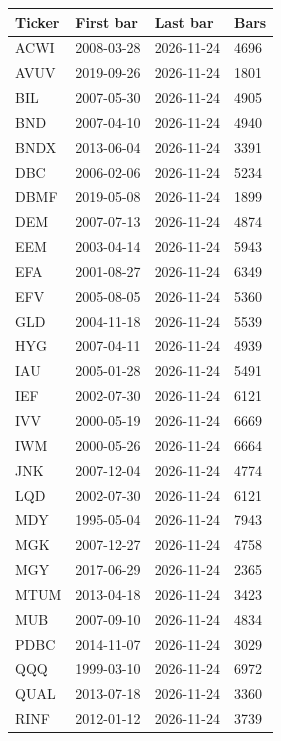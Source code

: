 \begin{tabularx}{\textwidth}{@{}P{0.62in}P{0.92in}P{0.92in}Y@{}}
\toprule
Ticker & First bar & Last bar & Bars \\
\midrule
ACWI & 2008-03-28 & 2026-11-24 & 4696 \\
AVUV & 2019-09-26 & 2026-11-24 & 1801 \\
BIL & 2007-05-30 & 2026-11-24 & 4905 \\
BND & 2007-04-10 & 2026-11-24 & 4940 \\
BNDX & 2013-06-04 & 2026-11-24 & 3391 \\
DBC & 2006-02-06 & 2026-11-24 & 5234 \\
DBMF & 2019-05-08 & 2026-11-24 & 1899 \\
DEM & 2007-07-13 & 2026-11-24 & 4874 \\
EEM & 2003-04-14 & 2026-11-24 & 5943 \\
EFA & 2001-08-27 & 2026-11-24 & 6349 \\
EFV & 2005-08-05 & 2026-11-24 & 5360 \\
GLD & 2004-11-18 & 2026-11-24 & 5539 \\
HYG & 2007-04-11 & 2026-11-24 & 4939 \\
IAU & 2005-01-28 & 2026-11-24 & 5491 \\
IEF & 2002-07-30 & 2026-11-24 & 6121 \\
IVV & 2000-05-19 & 2026-11-24 & 6669 \\
IWM & 2000-05-26 & 2026-11-24 & 6664 \\
JNK & 2007-12-04 & 2026-11-24 & 4774 \\
LQD & 2002-07-30 & 2026-11-24 & 6121 \\
MDY & 1995-05-04 & 2026-11-24 & 7943 \\
MGK & 2007-12-27 & 2026-11-24 & 4758 \\
MGY & 2017-06-29 & 2026-11-24 & 2365 \\
MTUM & 2013-04-18 & 2026-11-24 & 3423 \\
MUB & 2007-09-10 & 2026-11-24 & 4834 \\
PDBC & 2014-11-07 & 2026-11-24 & 3029 \\
QQQ & 1999-03-10 & 2026-11-24 & 6972 \\
QUAL & 2013-07-18 & 2026-11-24 & 3360 \\
RINF & 2012-01-12 & 2026-11-24 & 3739 \\

\end{tabularx}
